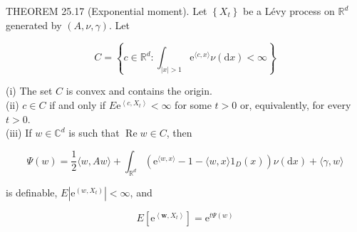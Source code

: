 \documentclass[a4paper,11pt]{article}
\begin{document}

THEOREM 25.17 (Exponential moment). Let $\left\{X_{t}\right\}$ be a Lévy process on $\mathbb{R}^{d}$
generated by $(A, \nu, \gamma)$. Let

$$
    C=\left\{c \in \mathbb{R}^{d}: \int_{|x|>1} \mathrm{e}^{\langle c, x\rangle} \nu(\mathrm{d} x)<\infty\right\}
$$

(i) The set $C$ is convex and contains the origin. \\

(ii) $c \in C$ if and only if $E \mathrm{e}^{\left\langle c, X_{t}\right\rangle}<\infty$ for some $t>0$ or,
equivalently, for every $t>0$.\\

(iii) If $w \in \mathbb{C}^{d}$ is such that $\operatorname{Re} w \in C$, then


\begin{equation*}
    \Psi(w)=\frac{1}{2}\langle w, A w\rangle+\int_{\mathbb{R}^{d}}\left(\mathrm{e}^{\langle w, x\rangle}-1-\langle w, x\rangle 1_{D}(x)\right) \nu(\mathrm{d} x)+\langle\gamma, w\rangle \tag{25.11}
\end{equation*}


is definable, $E\left|\mathrm{e}^{\left(w, X_{t}\right)}\right|<\infty$, and


\begin{equation*}
    E\left[\mathrm{e}^{\left\langle\boldsymbol{w}, X_{t}\right\rangle}\right]=\mathrm{e}^{t \Psi(w)} \tag{25.12}
\end{equation*}
\end{document}
